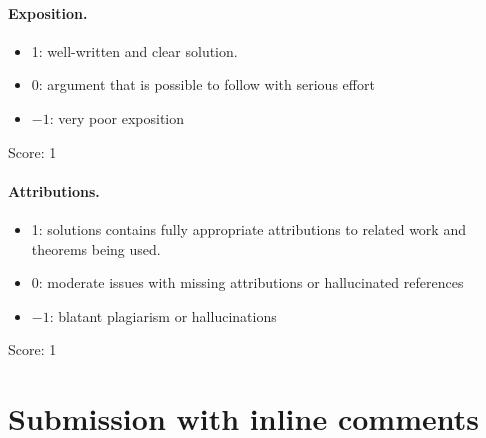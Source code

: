 \documentclass[11pt]{article}
\theoremstyle{definition}
\theoremstyle{remark}
\begin{document}
\paragraph{Exposition.}
\begin{itemize}
	\item  1: well-written and clear solution.
	\item  0: argument that is possible to follow with serious effort
	\item  $-1$: very poor exposition
\end{itemize}

\noindent Score: 1

\paragraph{Attributions.}
\begin{itemize}
	\item  1: solutions contains fully appropriate attributions
		to related work and theorems being used.
	\item  0: moderate issues with missing attributions or hallucinated references
	\item  $-1$: blatant plagiarism or hallucinations
\end{itemize}

\noindent Score: 1

\newpage
\section{Submission with inline comments}


\begin{abstract}
We study whether a symplectic simple normal crossings divisor admits local holomorphic defining coordinates for one tame almost complex structure, after a cohomologous symplectic deformation preserving the divisor. We prove the assertion in real dimension at most four, and for smooth divisors in dimension six. For a smooth divisor in any dimension we give an equivalent condition on holomorphic transition functions of its normal line. An explicit local example shows that invariance of the divisor and vanishing of the Nijenhuis tensor along it do not suffice for a prescribed almost complex structure. We also prove a conditional construction in arbitrary dimension from a finite collection of auxiliary divisors and compatible normal-bundle data. The realization of the full input to that construction is not established here; the unrestricted existence question remains unresolved in this paper.
\end{abstract}
\end{document}
